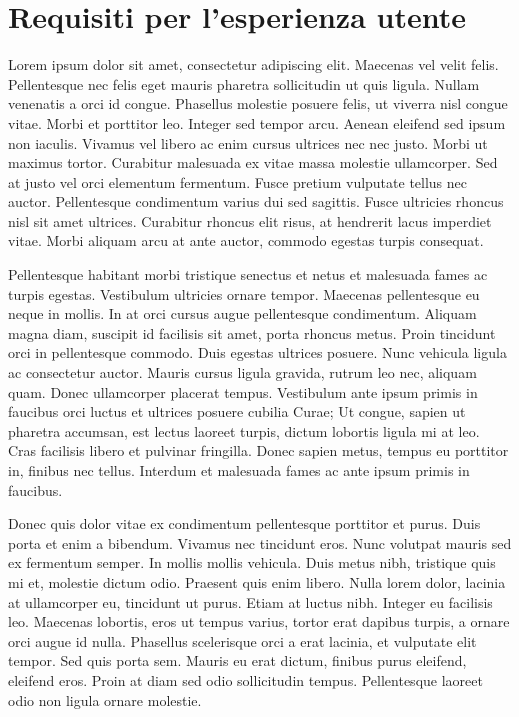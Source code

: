 \documentclass[11pt,fleqn]{book} %
\begin{document}
\section{Requisiti per l'esperienza utente}
Lorem ipsum dolor sit amet, consectetur adipiscing elit. Maecenas vel velit felis. Pellentesque nec felis eget mauris pharetra sollicitudin ut quis ligula. Nullam venenatis a orci id congue. Phasellus molestie posuere felis, ut viverra nisl congue vitae. Morbi et porttitor leo. Integer sed tempor arcu. Aenean eleifend sed ipsum non iaculis. Vivamus vel libero ac enim cursus ultrices nec nec justo. Morbi ut maximus tortor. Curabitur malesuada ex vitae massa molestie ullamcorper. Sed at justo vel orci elementum fermentum. Fusce pretium vulputate tellus nec auctor. Pellentesque condimentum varius dui sed sagittis. Fusce ultricies rhoncus nisl sit amet ultrices. Curabitur rhoncus elit risus, at hendrerit lacus imperdiet vitae. Morbi aliquam arcu at ante auctor, commodo egestas turpis consequat.

Pellentesque habitant morbi tristique senectus et netus et malesuada fames ac turpis egestas. Vestibulum ultricies ornare tempor. Maecenas pellentesque eu neque in mollis. In at orci cursus augue pellentesque condimentum. Aliquam magna diam, suscipit id facilisis sit amet, porta rhoncus metus. Proin tincidunt orci in pellentesque commodo. Duis egestas ultrices posuere. Nunc vehicula ligula ac consectetur auctor. Mauris cursus ligula gravida, rutrum leo nec, aliquam quam. Donec ullamcorper placerat tempus. Vestibulum ante ipsum primis in faucibus orci luctus et ultrices posuere cubilia Curae; Ut congue, sapien ut pharetra accumsan, est lectus laoreet turpis, dictum lobortis ligula mi at leo. Cras facilisis libero et pulvinar fringilla. Donec sapien metus, tempus eu porttitor in, finibus nec tellus. Interdum et malesuada fames ac ante ipsum primis in faucibus.

Donec quis dolor vitae ex condimentum pellentesque porttitor et purus. Duis porta et enim a bibendum. Vivamus nec tincidunt eros. Nunc volutpat mauris sed ex fermentum semper. In mollis mollis vehicula. Duis metus nibh, tristique quis mi et, molestie dictum odio. Praesent quis enim libero. Nulla lorem dolor, lacinia at ullamcorper eu, tincidunt ut purus. Etiam at luctus nibh. Integer eu facilisis leo. Maecenas lobortis, eros ut tempus varius, tortor erat dapibus turpis, a ornare orci augue id nulla. Phasellus scelerisque orci a erat lacinia, et vulputate elit tempor. Sed quis porta sem. Mauris eu erat dictum, finibus purus eleifend, eleifend eros. Proin at diam sed odio sollicitudin tempus. Pellentesque laoreet odio non ligula ornare molestie.
\newpage
\end{document}
